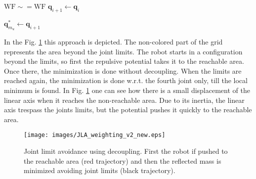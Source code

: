 \begin{algorithm}[H]
\begin{algorithmic}[1]
		
		

		
		\Else
		
		\State $\mathrm{WF \sim= WF }$ 
		\State $\mathbf{q}_{i+1} \leftarrow \mathbf{q}_i$
		
		\EndIf
		
		
		
		
		\EndIf
		
		\State $\mathbf{q}_{m_u}^\ast \leftarrow \mathbf{q}_{i+1}$ 
		
		\EndFor
	\end{algorithmic}
\end{algorithm}



  In the Fig. \ref{fig:wf_for_jla} this approach is depicted. The non-colored part of the grid represents the area beyond the joint limits. The robot starts in a configuration beyond the limits, so first the repulsive potential takes it to the reachable area. Once there, the minimization is done without decoupling. When the limits are reached again,  the minimization is done w.r.t. the fourth joint only, till the local minimum is found. In Fig. \ref{fig:wf_for_jla} one can see how there is a  small displacement of the linear axis when it reaches the non-reachable area. Due to its inertia, the linear axis trespass the joints limits, but the potential pushes it quickly to the reachable area.



\begin{figure}[!htb]
	\centerline{
		\texttt{[image: images/JLA\_weighting\_v2\_new.eps]}}
	\caption{Joint limit avoidance using decoupling. First the robot if pushed to the reachable area (red trajectory) and then the reflected mass is minimized avoiding joint limits (black trajectory).}
	\label{fig:wf_for_jla}
\end{figure}




